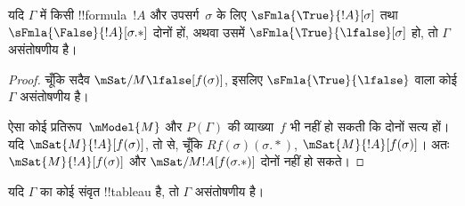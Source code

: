 \documentclass[../../../include/open-logic-section]{subfiles}
\begin{document}
\begin{prop}
  यदि $\Gamma$ में किसी !!{formula}~$!A$ और उपसर्ग~$\sigma$ के लिए
  $\sFmla{\True}{!A}[\sigma]$ तथा
  $\sFmla{\False}{!A}[\sigma.{*}]$ दोनों हों, अथवा उसमें
  $\sFmla{\True}{\lfalse}[\sigma]$ हो, तो $\Gamma$ असंतोषणीय है।
\end{prop}

\begin{proof}
  चूँकि सदैव $\mSat/{M}{\lfalse}[f(\sigma)]$, इसलिए
  $\sFmla{\True}{\lfalse}$ वाला कोई $\Gamma$ असंतोषणीय है।

  ऐसा कोई प्रतिरूप~$\mModel{M}$ और $P(\Gamma)$ की व्याख्या~$f$ भी नहीं हो
  सकती कि दोनों सत्य हों। यदि $\mSat{M}{!A}[f(\sigma)]$, तो
   से, चूँकि
  $Rf(\sigma)(\sigma.{*})$, $\mSat{M}{!A}[f(\sigma)]$। अतः
  $\mSat{M}{!A}[f(\sigma)]$ और
  $\mSat/{M}{!A}[f(\sigma.{*})]$ दोनों नहीं हो सकते।
\end{proof}

\begin{thm}[यथार्थता]
  यदि $\Gamma$ का कोई संवृत !!{tableau} है, तो $\Gamma$ असंतोषणीय है।
\end{thm}
\end{document}
